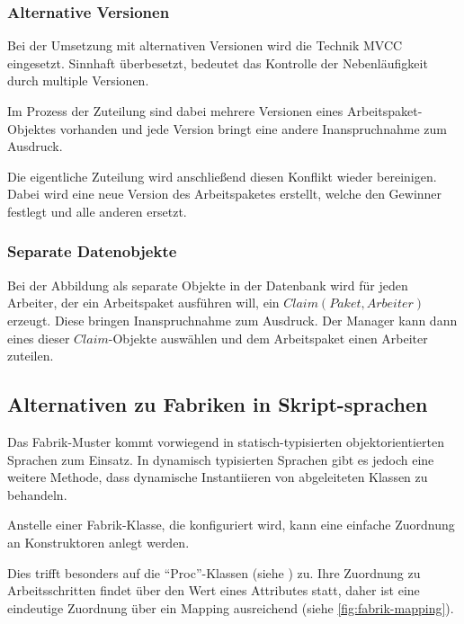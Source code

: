 \subsubsection{Alternative Versionen}

Bei der Umsetzung mit alternativen Versionen wird die Technik \ac{MVCC} eingesetzt.
Sinnhaft überbesetzt, bedeutet das Kontrolle der Nebenläufigkeit durch multiple Versionen.

Im Prozess der Zuteilung sind dabei mehrere Versionen eines Arbeitspaket-Objektes vorhanden und jede Version bringt eine andere Inanspruchnahme zum Ausdruck.

Die eigentliche Zuteilung wird anschließend diesen Konflikt wieder bereinigen.
Dabei wird eine neue Version des Arbeitspaketes erstellt, welche den Gewinner festlegt und alle anderen ersetzt.

\subsubsection{Separate Datenobjekte}

Bei der Abbildung als separate Objekte in der Datenbank
wird für jeden Arbeiter, der ein Arbeitspaket ausführen will, ein $Claim (Paket, Arbeiter)$ erzeugt. Diese bringen Inanspruchnahme zum Ausdruck.
Der Manager kann dann eines dieser $Claim$-Objekte auswählen und dem Arbeitspaket einen Arbeiter zuteilen.

\subsection{Alternativen zu Fabriken in Skript-sprachen}

Das Fabrik-Muster kommt vorwiegend in statisch-typisierten objektorientierten Sprachen zum Einsatz. In dynamisch typisierten Sprachen gibt es jedoch eine weitere Methode, dass dynamische Instantiieren von abgeleiteten Klassen zu behandeln.

Anstelle einer Fabrik-Klasse, die konfiguriert wird,
kann eine einfache Zuordnung an Konstruktoren anlegt werden.

Dies trifft besonders auf die ``Proc''-Klassen (siehe ) zu.
Ihre Zuordnung zu Arbeitsschritten findet über den Wert eines Attributes statt,
daher ist eine eindeutige Zuordnung über ein Mapping ausreichend (siehe \cref{fig:fabrik-mapping}).

